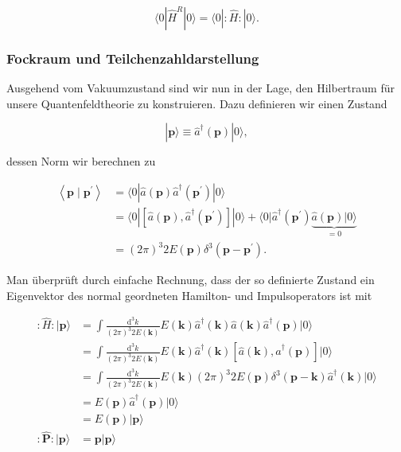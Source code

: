 \documentclass[10pt, letterpaper]{article}
\begin{document}
$$
\langle 0| \hat{H}^{R}|0\rangle=\langle 0|: \hat{H}:|0\rangle .
$$

\subsubsection*{Fockraum und Teilchenzahldarstellung}
Ausgehend vom Vakuumzustand sind wir nun in der Lage, den Hilbertraum für unsere Quantenfeldtheorie zu konstruieren. Dazu definieren wir einen Zustand

$$
|\mathbf{p}\rangle \equiv \hat{a}^{\dagger}(\mathbf{p})|0\rangle,
$$

dessen Norm wir berechnen zu

$$
\begin{aligned}
\left\langle\mathbf{p} \mid \mathbf{p}^{\prime}\right\rangle & =\langle 0| \hat{a}(\mathbf{p}) \hat{a}^{\dagger}\left(\mathbf{p}^{\prime}\right)|0\rangle \\
& =\langle 0|\left[\hat{a}(\mathbf{p}), \hat{a}^{\dagger}\left(\mathbf{p}^{\prime}\right)\right]|0\rangle+\langle 0| \hat{a}^{\dagger}\left(\mathbf{p}^{\prime}\right) \underbrace{\hat{a}(\mathbf{p})|0\rangle}_{=0} \\
& =(2 \pi)^{3} 2 E(\mathbf{p}) \delta^{3}\left(\mathbf{p}-\mathbf{p}^{\prime}\right) .
\end{aligned}
$$

Man überprüft durch einfache Rechnung, dass der so definierte Zustand ein Eigenvektor des normal geordneten Hamilton- und Impulsoperators ist mit

$$
\begin{aligned}
: \hat{H}:|\mathbf{p}\rangle & =\int \frac{\mathrm{d}^{3} k}{(2 \pi)^{3} 2 E(\mathbf{k})} E(\mathbf{k}) \hat{a}^{\dagger}(\mathbf{k}) \hat{a}(\mathbf{k}) \hat{a}^{\dagger}(\mathbf{p})|0\rangle \\
& =\int \frac{\mathrm{d}^{3} k}{(2 \pi)^{3} 2 E(\mathbf{k})} E(\mathbf{k}) \hat{a}^{\dagger}(\mathbf{k})\left[\hat{a}(\mathbf{k}), \hat{a}^{\dagger}(\mathbf{p})\right]|0\rangle \\
& =\int \frac{\mathrm{d}^{3} k}{(2 \pi)^{3} 2 E(\mathbf{k})} E(\mathbf{k})(2 \pi)^{3} 2 E(\mathbf{p}) \delta^{3}(\mathbf{p}-\mathbf{k}) \hat{a}^{\dagger}(\mathbf{k})|0\rangle \\
& =E(\mathbf{p}) \hat{a}^{\dagger}(\mathbf{p})|0\rangle \\
& =E(\mathbf{p})|\mathbf{p}\rangle \\
: \hat{\mathbf{P}}:|\mathbf{p}\rangle & =\mathbf{p}|\mathbf{p}\rangle
\end{aligned}
$$
\end{document}
